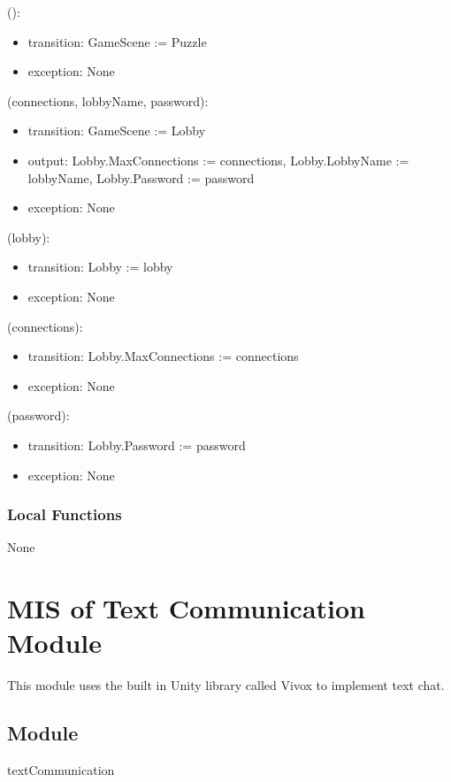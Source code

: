 \documentclass[12pt, titlepage]{article}
\begin{document}
():
\begin{itemize}
\item transition: GameScene := Puzzle
\item exception: None
\end{itemize}

(connections, lobbyName, password):
\begin{itemize}
\item transition: GameScene := Lobby
\item output: Lobby.MaxConnections := connections, Lobby.LobbyName := lobbyName, Lobby.Password := password
\item exception: None
\end{itemize}

(lobby):
\begin{itemize}
\item transition: Lobby := lobby
\item exception: None
\end{itemize}

(connections):
\begin{itemize}
\item transition: Lobby.MaxConnections := connections
\item exception: None
\end{itemize}

(password):
\begin{itemize}
\item transition: Lobby.Password := password
\item exception: None 
\end{itemize}

\subsubsection{Local Functions}

None

\newpage

\section{MIS of Text Communication Module} \label{text} 

  This module uses the built in Unity library called Vivox to implement text chat.


\subsection{Module}
textCommunication
\end{document}
